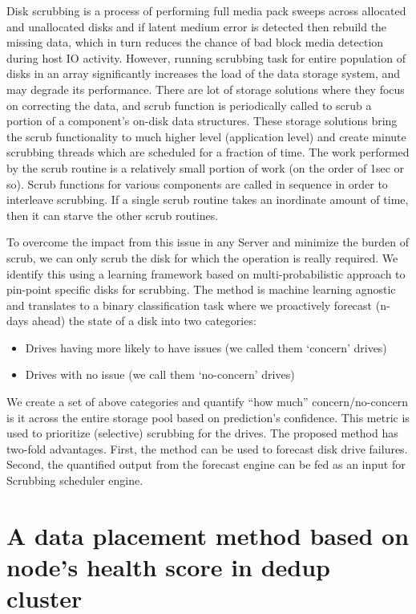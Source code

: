 \documentclass{article}
\begin{document}
Disk scrubbing is a process of performing full media pack sweeps across allocated and unallocated disks and if latent medium error is detected then rebuild the missing data, which in turn reduces the chance of bad block media detection during host IO activity. However, running scrubbing task for entire population of disks in an array significantly increases the load of the data storage system, and may degrade its performance. 
There are lot of storage solutions where they focus on correcting the data, and scrub function is periodically called to scrub a portion of a component's on-disk data structures. These storage solutions bring the scrub functionality to much higher level (application level) and create minute scrubbing threads which are scheduled for a fraction of time. The work performed by the scrub routine is a relatively small portion of work (on the order of 1sec or so).  Scrub functions for various components are called in sequence in order to interleave scrubbing.  If a single scrub routine takes an inordinate amount of time, then it can starve the other scrub routines.

To overcome the impact from this issue in any Server and minimize the burden of scrub, we can only scrub the disk for which the operation is really required. We identify this using a learning framework based on multi-probabilistic approach to pin-point specific disks for scrubbing. The method is machine learning agnostic and translates to a binary classification task where we proactively forecast (n-days ahead) the state of a disk into two categories:
\begin{itemize} \itemsep 1pt
\item {Drives having more likely to have issues (we called them ‘concern’ drives) }  
\item {Drives with no issue (we call them ‘no-concern’ drives)}  
\end{itemize}
We create a set of above categories and quantify “how much” concern/no-concern is it across the entire storage pool based on prediction’s confidence. This metric is used to prioritize (selective) scrubbing for the drives. 
The proposed method has two-fold advantages. First, the method can be used to forecast disk drive failures. Second, the quantified output from the forecast engine can be fed as an input for Scrubbing scheduler engine. 



\section{A data placement method based on node's health score in dedup cluster}
\end{document}
